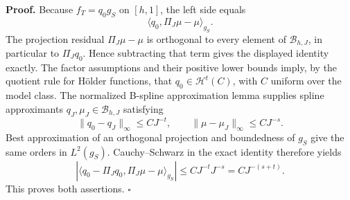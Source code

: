 \textbf{Proof.}
Because \(f_T=q_0g_S\) on \([h,1]\), the left side equals
\[
\langle q_0,\Pi_J\mu-\mu\rangle_{g_S}.
\]
The projection residual \(\Pi_J\mu-\mu\) is orthogonal to every element of \(\mathcal B_{h,J}\), in particular to \(\Pi_Jq_0\). Hence subtracting that term gives the displayed identity exactly. The factor assumptions and their positive lower bounds imply, by the quotient rule for Hölder functions, that \(q_0\in\mathcal H^t(C)\), with \(C\) uniform over the model class. The normalized B-spline approximation lemma supplies spline approximants \(q_J,\mu_J\in\mathcal B_{h,J}\) satisfying
\[
\|q_0-q_J\|_\infty\le CJ^{-t},\qquad
\|\mu-\mu_J\|_\infty\le CJ^{-s}.
\]
Best approximation of an orthogonal projection and boundedness of \(g_S\) give the same orders in \(L^2(g_S)\). Cauchy--Schwarz in the exact identity therefore yields
\[
\left|\langle q_0-\Pi_Jq_0,\Pi_J\mu-\mu\rangle_{g_S}\right|
\le CJ^{-t}J^{-s}=CJ^{-(s+t)}.
\]
This proves both assertions. \(\square\)